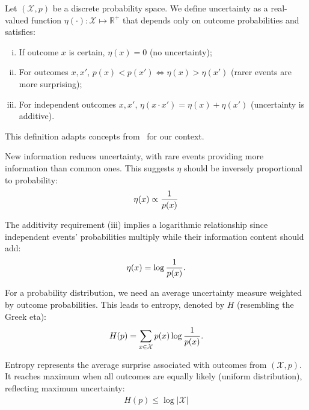 \begin{definition}
  Let $(\mathcal{X}, p)$ be a discrete probability space. We define \textnormal{\sffamily uncertainty} as a real-valued function $\eta(\cdot): \mathcal{X} \mapsto \mathbb{R}^+$ that depends only on outcome probabilities and satisfies:
  \begin{enumerate}[(i)]
  \item If outcome $x$ is certain, $\eta(x) = 0$ (no uncertainty);
  \item For outcomes $x, x'$, $p(x) < p(x') \iff \eta(x) > \eta(x')$ (rarer events are more surprising);
  \item For independent outcomes $x, x'$, $\eta(x \cdot x') = \eta(x) + \eta(x')$ (uncertainty is additive).
  \end{enumerate}
\end{definition}
\begin{remark}
  This definition adapts concepts from~\cite{ref:martin-2011} for our context.
\end{remark}

New information reduces uncertainty, with rare events providing more information than common ones. This suggests $\eta$ should be inversely proportional to probability:
\begin{align}
  \label{eq:eta-1}
  \eta(x) \propto {1 \over p(x)}
\end{align}

The additivity requirement (iii) implies a logarithmic relationship since independent events' probabilities multiply while their information content should add:
\begin{align}
  \label{eq:eta-3}
  \eta(x) = \log{1 \over p(x)}.
\end{align}

For a probability distribution, we need an average uncertainty measure weighted by outcome probabilities. This leads to entropy, denoted by $H$ (resembling the Greek eta):
\begin{align}
  \label{eq:eta-almost}
  H(p) = \sum_{x \in \mathcal{X}} p(x) \log{1 \over p(x)}.
\end{align}

Entropy represents the average surprise associated with outcomes from $(\mathcal{X}, p)$. It reaches maximum when all outcomes are equally likely (uniform distribution), reflecting maximum uncertainty:
\begin{align}
  \label{eq:eta-2}
  H(p) \leq \log{|\mathcal{X}|}
\end{align}

